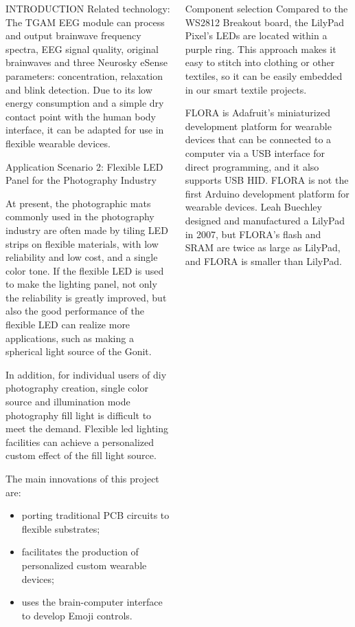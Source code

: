 \documentclass[final]{beamer}
\begin{document}
\begin{frame}[t, fragile = singleslide]{}
\begin{columns}[t]
\begin{column}{0.45\textwidth}
\begin{block}{INTRODUCTION}
Related technology:
The TGAM EEG module can process and output brainwave frequency spectra, EEG signal quality, original brainwaves and three Neurosky eSense parameters: concentration, relaxation and blink detection. Due to its low energy consumption and a simple dry contact point with the human body interface, it can be adapted for use in flexible wearable devices.

Application Scenario 2: Flexible LED Panel for the Photography Industry

At present, the photographic mats commonly used in the photography industry are often made by tiling LED strips on flexible materials, with low reliability and low cost, and a single color tone. If the flexible LED is used to make the lighting panel, not only the reliability is greatly improved, but also the good performance of the flexible LED can realize more applications, such as making a spherical light source of the Gonit.

In addition, for individual users of diy photography creation, single color source and illumination mode photography fill light is difficult to meet the demand. Flexible led lighting facilities can achieve a personalized custom effect of the fill light source.


  The main innovations of this project are:
  \begin{itemize}
    \item porting traditional PCB circuits to flexible substrates;
    \item facilitates the production of personalized custom wearable devices;
    \item uses the brain-computer interface to develop Emoji controls.
  \end{itemize}
\end{block}

\end{column}

\begin{column}{0.45\textwidth}

\begin{block}{Component selection}
Compared to the WS2812 Breakout board, the LilyPad Pixel's LEDs are located within a purple ring. This approach makes it easy to stitch into clothing or other textiles, so it can be easily embedded in our smart textile projects.

FLORA is Adafruit's miniaturized development platform for wearable devices that can be connected to a computer via a USB interface for direct programming, and it also supports USB HID. FLORA is not the first Arduino development platform for wearable devices. Leah Buechley designed and manufactured a LilyPad in 2007, but FLORA's flash and SRAM are twice as large as LilyPad, and FLORA is smaller than LilyPad. 


\end{block}
\end{column}
\end{columns}
\end{frame}
\end{document}

